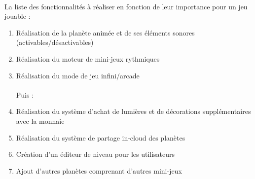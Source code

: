 \paragraph{}
La liste des fonctionnalités à réaliser en fonction de leur importance pour un jeu jouable :
\begin{enumerate}
\item Réalisation de la planète animée et de ses éléments sonores (activables/désactivables)
\item Réalisation du moteur de mini-jeux rythmiques
\item Réalisation du mode de jeu infini/arcade
\\\\Puis :
\item Réalisation du système d’achat de lumières et de décorations supplémentaires avec la monnaie
\item Réalisation du système de partage in-cloud des planètes
\item Création d'un éditeur de niveau pour les utilisateurs
\item Ajout d’autres planètes comprenant d’autres mini-jeux
\end{enumerate}

